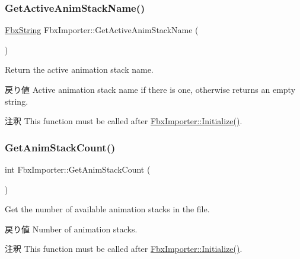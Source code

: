 \mbox{\label{class_fbx_importer_a7d0e41971469f7fb42fdd0af77a98c2a}} 
\subsubsection{\texorpdfstring{Get\+Active\+Anim\+Stack\+Name()}{GetActiveAnimStackName()}}
{\footnotesize\ttfamily \hyperlink{class_fbx_string}{Fbx\+String} Fbx\+Importer\+::\+Get\+Active\+Anim\+Stack\+Name (\begin{DoxyParamCaption}{ }\end{DoxyParamCaption})}

Return the active animation stack name. \begin{DoxyReturn}{戻り値}
Active animation stack name if there is one, otherwise returns an empty string. 
\end{DoxyReturn}
\begin{DoxyRemark}{注釈}
This function must be called after \hyperlink{class_fbx_importer_a70528a9ca1ff737bda9696a2073acd13}{Fbx\+Importer\+::\+Initialize()}. 
\end{DoxyRemark}
\mbox{\label{class_fbx_importer_a08165aec1a0ae0ff5f88c5ee8244bd9d}} 
\subsubsection{\texorpdfstring{Get\+Anim\+Stack\+Count()}{GetAnimStackCount()}}
{\footnotesize\ttfamily int Fbx\+Importer\+::\+Get\+Anim\+Stack\+Count (\begin{DoxyParamCaption}{ }\end{DoxyParamCaption})}

Get the number of available animation stacks in the file. \begin{DoxyReturn}{戻り値}
Number of animation stacks. 
\end{DoxyReturn}
\begin{DoxyRemark}{注釈}
This function must be called after \hyperlink{class_fbx_importer_a70528a9ca1ff737bda9696a2073acd13}{Fbx\+Importer\+::\+Initialize()}. 
\end{DoxyRemark}
\mbox{\label{class_fbx_importer_a57e28b23f1290b95ea49dcee58956f12}} 
